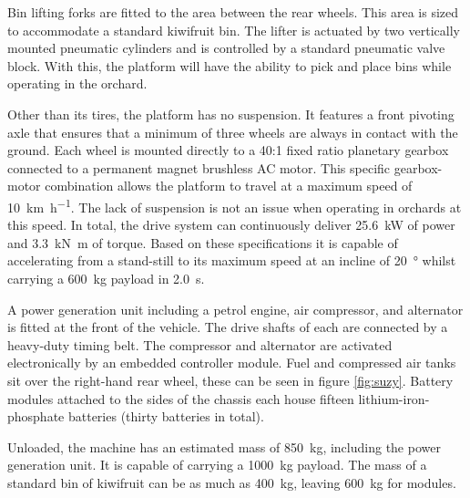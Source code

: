 \documentclass[preprint,authoryear,12pt]{elsarticle}
\begin{document}
        Bin lifting forks are fitted to the area between the rear wheels.
        This area is sized to accommodate a standard kiwifruit bin.
        The lifter is actuated by two vertically mounted pneumatic cylinders and is controlled by a standard pneumatic valve block.
        With this, the platform will have the ability to pick and place bins while operating in the orchard.

        Other than its tires, the platform has no suspension.
        It features a front pivoting axle that ensures that a minimum of three wheels are always in contact with the ground.
        Each wheel is mounted directly to a 40:1 fixed ratio planetary gearbox connected to a permanent magnet brushless AC motor.
        This specific gearbox-motor combination allows the platform to travel at a maximum speed of \SI{10}{\kilo\meter\per\hour}.
        The lack of suspension is not an issue when operating in orchards at this speed.
        In total, the drive system can continuously deliver \SI{25.6}{\kilo\watt} of power and \SI{3.3}{\kilo\newton\meter} of torque.
        Based on these specifications it is capable of accelerating from a stand-still to its maximum speed at an incline of \SI{20}{\degree} whilst carrying a \SI{600}{\kilo\gram} payload in \SI{2.0}{\second}.

        A power generation unit including a petrol engine, air compressor, and alternator is fitted at the front of the vehicle.
        The drive shafts of each are connected by a heavy-duty timing belt.
        The compressor and alternator are activated electronically by an embedded controller module.
        Fuel and compressed air tanks sit over the right-hand rear wheel, these can be seen in figure \ref{fig:suzy}.
        Battery modules attached to the sides of the chassis each house fifteen lithium-iron-phosphate batteries (thirty batteries in total).

        Unloaded, the machine has an estimated mass of \SI{850}{\kilo\gram}, including the power generation unit.
        It is capable of carrying a \SI{1000}{\kilo\gram} payload.
        The mass of a standard bin of kiwifruit can be as much as \SI{400}{\kilo\gram}, leaving \SI{600}{\kilo\gram} for modules.
\end{document}
